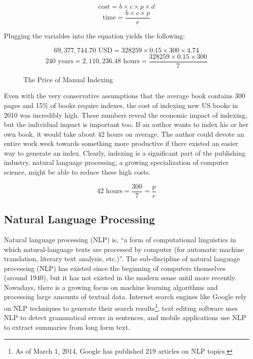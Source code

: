 \begin{figure}[H]
$$ \text{cost} = b \times c \times p \times d $$
$$ \text{time} = \frac{b \times c \times p}{r} $$
\end{figure}

Plugging the variables into the equation yields the following:

\begin{figure}[H]
$$ 69,377,744.70 \text{ USD} = 328259 \times 0.15 \times 300 \times 4.74 $$
$$ 240 \text{ years}= 2,110,236.48 \text{ hours} = \frac{328259 \times 0.15 \times 300}{7}$$
\caption{The Price of Manual Indexing}
\end{figure}

Even with the very conservative assumptions that the average book contains 300 pages and 15\% of books require indexes, the cost of indexing new US books in 2010 was incredibly high.
These numbers reveal the economic impact of indexing, but the individual impact is important too.
If an author wants to index his or her own book, it would take about 42 hours on average. The author could devote an entire work week towards something more productive if there existed an easier way to generate an index.
Clearly, indexing is a significant part of the publishing industry.
natural language processing, a growing specialization of computer science, might be able to reduce these high costs.

\begin{figure}
$$ 42 \text{ hours} = \frac{300}{7} = \frac{p}{r}$$
\end{figure}

\subsection{Natural Language Processing}

Natural language processing (NLP) is, ``a form of computational linguistics in which natural-language texts are processed by computer (for automatic machine translation, literary text analysis, etc.)''\cite{oed-nlp}.
The sub-discipline of natural language processing (NLP) has existed since the beginning of computers themselves (around 1940), but it has not existed in the modern sense until more recently.
Nowadays, there is a growing focus on machine learning algorithms and processing large amounts of textual data\cite{jurafsky}.
Internet search engines like Google rely on NLP techniques to generate their search results\footnote{As of March 1, 2014, Google has published 219 articles on NLP topics.\cite{google-nlp}}, text editing software uses NLP to detect grammatical errors in sentences\cite{norvig}, and mobile applications use NLP to extract summaries from long form text\cite{bit-of-news}.



